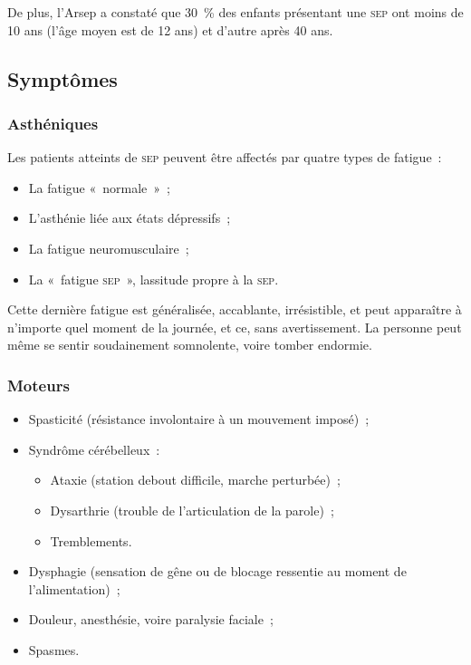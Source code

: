 \documentclass[a4paper,12pt,francais]{article}
\newcommand{\SEP}{\textsc{sep}\xspace}
\begin{document}
De plus, l’Arsep a constaté que 30~\% des enfants présentant une \SEP{} ont moins de 10 ans (l’âge moyen est de 12 ans) et d'autre après 40 ans.



\subsection{Symptômes}

\subsubsection{Asthéniques}
Les patients atteints de \SEP{} peuvent être affectés par quatre types de fatigue~:
\begin{itemize}
    \item La fatigue «~normale~»~;
    \item L’asthénie liée aux états dépressifs~;
    \item La fatigue neuromusculaire~;
    \item La «~fatigue \SEP{}~», lassitude propre à la \SEP{}.
\end{itemize}

Cette dernière fatigue est généralisée, accablante, irrésistible, et peut apparaître à n’importe quel moment de la journée, et ce, sans avertissement. La personne peut même se sentir soudainement somnolente, voire tomber endormie.

\subsubsection{Moteurs}
\begin{itemize}
    \item Spasticité (résistance involontaire à un mouvement imposé)~;
    \item Syndrôme cérébelleux~:
        \begin{itemize}
            \item Ataxie (station debout difficile, marche perturbée)~;
            \item Dysarthrie (trouble de l’articulation de la parole)~;
            \item Tremblements.
        \end{itemize}
    \item Dysphagie (sensation de gêne ou de blocage ressentie au moment de l’alimentation)~;
    \item Douleur, anesthésie, voire paralysie faciale~;
    \item Spasmes.
\end{itemize}
\end{document}
